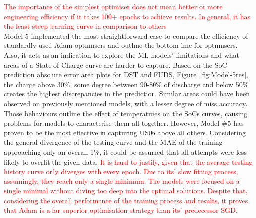 %
%
\textcolor{red}{The importance of the simplest optimiser does not mean better or more engineering efficiency if it takes 100+ epochs to achieve results. In general, it has the least steep learning curve in comparison to others} \\
Model 5 implemented the most straightforward case to compare the efficiency of standardly used Adam optimisers and outline the bottom line for optimisers.
Also, it acts as an indication to explore the ML models' limitations and what areas of a State of Charge curve are harder to capture.
Based on the SoC prediction absolute error area plots for DST and FUDS, Figure~\ref{fig:Model-5res}, the charge above 30\%, some degree between 90-80\% of discharge and below 50\% creates the highest discrepancies in the prediction.
Similar areas could have been observed on previously mentioned models, with a lesser degree of miss accuracy.
Those behaviours outline the effect of temperatures on the SoCs curves, causing problems for models to characterise them all together.
However, Model \#5 has proven to be the most effective in capturing US06 above all others.
Considering the general divergence of the testing curve and the MAE of the training approaching only an overall 1\%, it could be assumed that all attempts were less likely to overfit the given data.
\textcolor{red}{
It is hard to justify, given that the average testing history curve only diverges with every epoch.
Due to its' slow fitting process, assumingly, they reach only a single minimum.
The models were focused on a single minimal without diving too deep into the optimal solutions.
Despite that, considering the overall performance of the training process and results, it proves that Adam is a far superior optimisation strategy than its' predecessor SGD.
}

